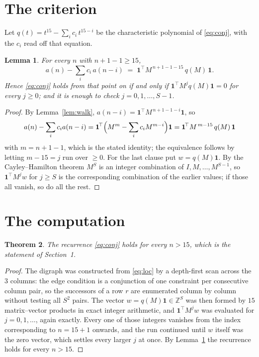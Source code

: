 \documentclass[11pt,a4paper]{article}
\theoremstyle{plain}
\newtheorem{theorem}{Theorem}
\newtheorem{lemma}[theorem]{Lemma}
\theoremstyle{definition}
\begin{document}
\section{The criterion}

Let $q(t)=t^{15}-\sum_i c_i\,t^{15-i}$ be the characteristic polynomial of
\eqref{eq:conj}, with the $c_i$ read off that equation.

\begin{lemma}\label{lem:crit}
For every $n$ with $n+1-1\ge15$,
\[
a(n)-\sum_i c_i\,a(n-i)\;=\;\mathbf{1}^{\!\top}M^{\,n+1-1-15}\,q(M)\,\mathbf{1} .
\]
Hence \eqref{eq:conj} holds from that point on if and only if
$\mathbf{1}^{\!\top}M^{j}q(M)\mathbf{1}=0$ for every $j\ge0$; and it is enough to check
$j=0,1,\dots,S-1$.
\end{lemma}

\begin{proof}
By Lemma~\ref{lem:walk}, $a(n-i)=\mathbf{1}^{\!\top}M^{\,n+1-1-i}\mathbf{1}$, so
\[
a(n)-\sum_i c_i a(n-i)
=\mathbf{1}^{\!\top}\Bigl(M^{m}-\sum_i c_i M^{m-i}\Bigr)\mathbf{1}
=\mathbf{1}^{\!\top}M^{\,m-15}\,q(M)\,\mathbf{1}
\]
with $m=n+1-1$, which is the stated identity; the equivalence follows by letting
$m-15=j$ run over $\ge0$. For the last clause put $w=q(M)\mathbf{1}$. By the
Cayley--Hamilton theorem $M^{S}$ is an integer combination of $I,M,\dots,M^{S-1}$, so
$\mathbf{1}^{\!\top}M^{j}w$ for $j\ge S$ is the corresponding combination of the earlier
values; if those all vanish, so do all the rest.
\end{proof}

\section{The computation}

\begin{theorem}
The recurrence \eqref{eq:conj} holds for every $n>15$, which is the statement of
Section~1.
\end{theorem}

\begin{proof}
The digraph was constructed from \eqref{eq:loc} by a depth-first scan across the $3$
columns: the edge condition is a conjunction of one constraint per consecutive column
pair, so the successors of a row $r$ are enumerated column by column without testing all
$S^2$ pairs. The vector $w=q(M)\mathbf{1}\in\mathbb{Z}^{S}$ was then formed by $15$
matrix--vector products in exact integer arithmetic, and $\mathbf{1}^{\!\top}M^{j}w$ was
evaluated for $j=0,1,\dots$, again exactly. Every one of those integers vanishes from the
index corresponding to $n=15+1$ onwards, and the run continued until $w$ itself was the
zero vector, which settles every larger $j$ at once. By Lemma~\ref{lem:crit} the recurrence
holds for every $n>15$.
\end{proof}
\end{document}
